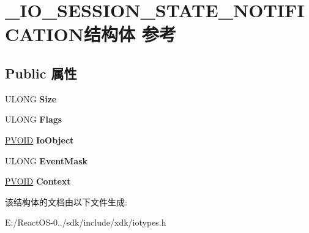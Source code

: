 \hypertarget{struct___i_o___s_e_s_s_i_o_n___s_t_a_t_e___n_o_t_i_f_i_c_a_t_i_o_n}{}\section{\+\_\+\+I\+O\+\_\+\+S\+E\+S\+S\+I\+O\+N\+\_\+\+S\+T\+A\+T\+E\+\_\+\+N\+O\+T\+I\+F\+I\+C\+A\+T\+I\+O\+N结构体 参考}
\label{struct___i_o___s_e_s_s_i_o_n___s_t_a_t_e___n_o_t_i_f_i_c_a_t_i_o_n}
\subsection*{Public 属性}
\begin{DoxyCompactItemize}
\item 
\mbox{\label{struct___i_o___s_e_s_s_i_o_n___s_t_a_t_e___n_o_t_i_f_i_c_a_t_i_o_n_a2eadfee3e23ea1656f67c33a365d8c78}} 
U\+L\+O\+NG {\bfseries Size}
\item 
\mbox{\label{struct___i_o___s_e_s_s_i_o_n___s_t_a_t_e___n_o_t_i_f_i_c_a_t_i_o_n_a34422e23ae7b2614762ce835e7260a47}} 
U\+L\+O\+NG {\bfseries Flags}
\item 
\mbox{\label{struct___i_o___s_e_s_s_i_o_n___s_t_a_t_e___n_o_t_i_f_i_c_a_t_i_o_n_a89125c757b70c2f62e1411eefe888863}} 
\hyperlink{interfacevoid}{P\+V\+O\+ID} {\bfseries Io\+Object}
\item 
\mbox{\label{struct___i_o___s_e_s_s_i_o_n___s_t_a_t_e___n_o_t_i_f_i_c_a_t_i_o_n_ada2ef81488b96080fe9cbeccf3e17a12}} 
U\+L\+O\+NG {\bfseries Event\+Mask}
\item 
\mbox{\label{struct___i_o___s_e_s_s_i_o_n___s_t_a_t_e___n_o_t_i_f_i_c_a_t_i_o_n_a3c91ee0b6280589404d1d8f9f6116ecd}} 
\hyperlink{interfacevoid}{P\+V\+O\+ID} {\bfseries Context}
\end{DoxyCompactItemize}


该结构体的文档由以下文件生成\+:\begin{DoxyCompactItemize}
\item 
E\+:/\+React\+O\+S-\/0../sdk/include/xdk/iotypes.\+h\end{DoxyCompactItemize}
